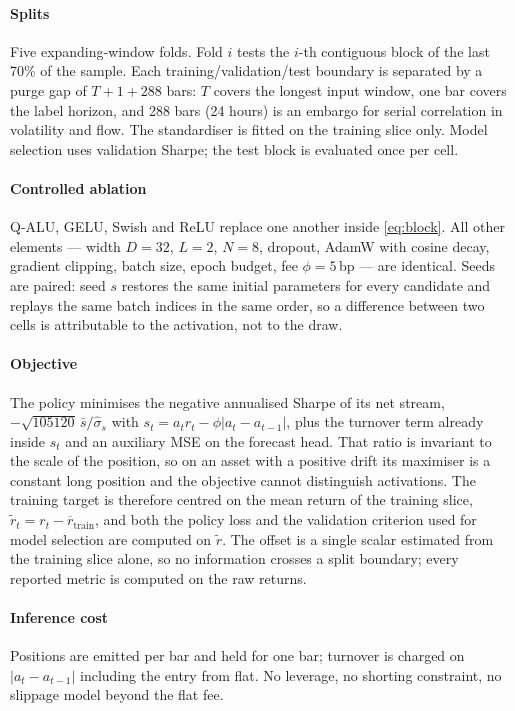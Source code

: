 \documentclass[conference]{IEEEtran}
\begin{document}
\paragraph{Splits}
Five expanding-window folds. Fold $i$ tests the $i$-th contiguous block of the
last 70\% of the sample. Each training/validation/test boundary is separated by
a purge gap of $T+1+288$ bars: $T$ covers the longest input window, one bar
covers the label horizon, and 288 bars (24 hours) is an embargo for serial
correlation in volatility and flow. The standardiser is fitted on the training
slice only. Model selection uses validation Sharpe; the test block is evaluated
once per cell.

\paragraph{Controlled ablation}
Q-ALU, GELU, Swish and ReLU replace one another inside \eqref{eq:block}. All
other elements --- width $D=32$, $L=2$, $N=8$, dropout, AdamW with cosine
decay, gradient clipping, batch size, epoch budget, fee $\phi=5$\,bp --- are
identical. Seeds are paired: seed $s$ restores the same initial parameters for
every candidate and replays the same batch indices in the same order, so a
difference between two cells is attributable to the activation, not to the
draw.

\paragraph{Objective}
The policy minimises the negative annualised Sharpe of its net stream,
$-\sqrt{105120}\,\bar{s}/\hat{\sigma}_s$ with
$s_t=a_t r_t-\phi|a_t-a_{t-1}|$, plus the turnover term already inside $s_t$ and
an auxiliary MSE on the forecast head. That ratio is invariant to the scale of
the position, so on an asset with a positive drift its maximiser is a constant
long position and the objective cannot distinguish activations. The training
target is therefore centred on the mean return of the training slice,
$\widetilde{r}_t=r_t-\overline{r}_{\mathrm{train}}$, and both the policy loss and the
validation criterion used for model selection are computed on $\widetilde{r}$. The
offset is a single scalar estimated from the training slice alone, so no
information crosses a split boundary; every reported metric is computed on the
raw returns.

\paragraph{Inference cost}
Positions are emitted per bar and held for one bar; turnover is charged on
$|a_t-a_{t-1}|$ including the entry from flat. No leverage, no shorting
constraint, no slippage model beyond the flat fee.
\end{document}
